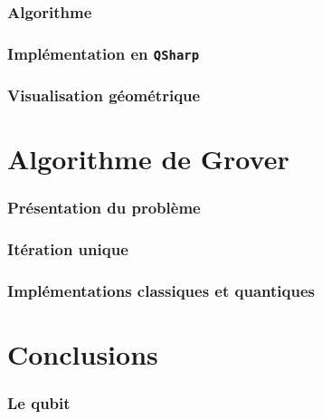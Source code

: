 \documentclass{beamer}
\begin{document}
\begin{frame}
\frametitle{Algorithme}
\end{frame}

\begin{frame}
\frametitle{Implémentation en \texttt{QSharp}}
\end{frame}

\begin{frame}
\frametitle{Visualisation géométrique}
\end{frame}

\section{Algorithme de Grover}

\begin{frame}
\frametitle{Présentation du problème}
\end{frame}

\begin{frame}
\frametitle{Itération unique}
\end{frame}

\begin{frame}
\frametitle{Implémentations classiques et quantiques}
\end{frame}

\section{Conclusions}

\begin{frame}
\frametitle{Le qubit}
\end{frame}
\end{document}

